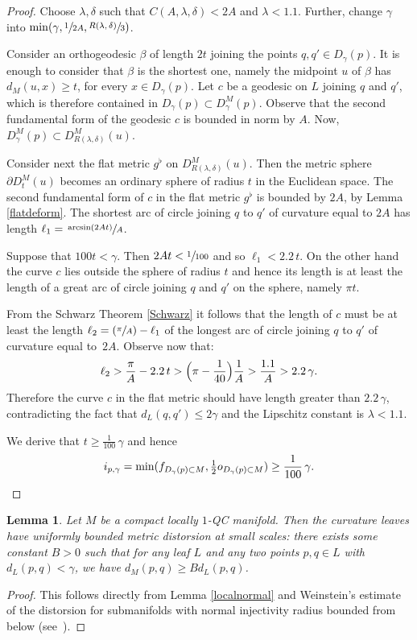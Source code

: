 \documentclass[10pt]{amsart}
\newcommand{\Psfrac}[2]{(\sfrac{#1}{#2})}
\newtheorem{lemma}[theorem]{Lemma}
\theoremstyle{definition}
\theoremstyle{remark}
\numberwithin{equation}{section}
\begin{document}
\begin{proof}
Choose $\lambda, \delta$ such that $C(A,\lambda,\delta) < 2A$ and
$\lambda <1.1$. Further, change $\gamma$ into $\min(\gamma, \sfrac{1}{2A}, \sfrac{R(\lambda, \delta)}{3})$.

Consider an orthogeodesic $\beta$ of length $2t$ joining the points $q,q'\in D_{\gamma}(p)$.
It is enough to consider that $\beta$ is the shortest one, namely the midpoint $u$ of $\beta$
has $d_M(u,x) \geq t$, for every $x\in D_{\gamma}(p)$.
Let $c$ be a geodesic on $L$ joining $q$ and $q'$, which is therefore contained in $D_{\gamma}(p)
\subset D^M_{\gamma}(p)$. Observe that the second fundamental form of the geodesic $c$ is bounded in norm by $A$.
Now, $D^M_{\gamma}(p)\subset D^M_{R(\lambda,\delta)}(u)$.

Consider next the flat metric $g^{\flat}$ on $D^M_{R(\lambda,\delta)}(u)$. Then the metric sphere
$\partial D^M_{t}(u)$ becomes an ordinary sphere of radius $t$ in the Euclidean space.
The second fundamental form of $c$ in the flat metric $g^{\flat}$ is bounded by $2A$, by Lemma \ref{flatdeform}.
The shortest arc of circle joining $q$ to $q'$ of curvature equal to $2A$ has length
$\ell_1=\sfrac{\arcsin(2At)}{A}$.

Suppose that $100t < \gamma$. Then $2At< \sfrac{1}{100}$ and so $\ell_1 < 2.2\, t$.
On the other hand the curve $c$ lies outside the sphere of radius $t$ and hence its length is
at least the length of a great arc of circle joining $q$ and $q'$ on the sphere, namely $\pi t$.

From the Schwarz Theorem \ref{Schwarz} it follows that the length of $c$ must be at least
the length $\ell_2=\Psfrac{\pi}{A}-\ell_1$ of the longest arc of circle joining $q$ to $q'$ of curvature equal to~$2A$.
Observe now that:
\[ \ell_2> \frac{\pi}{A}-2.2\, t > \Bigl(\pi -\frac{1}{40}\Bigr)\frac{1}{A} > \frac{1.1}{A} > 2.2\, \gamma.\]
Therefore the curve $c$ in the flat metric should have length greater than $2.2\, \gamma$, contradicting the fact that
$d_L(q,q') \leq 2\gamma$ and the Lipschitz constant is $\lambda < 1.1$.

We derive that $t \geq \frac{1}{100}\,\gamma$ and hence
\[ i_{p,\gamma}= \min(f_{D_{\gamma}(p)\subset M}, \tfrac12 o_{D_{\gamma}(p)\subset M}) \geq \frac{1}{100}\, \gamma.\qedhere\]
\end{proof}

\begin{lemma}\label{Weinstein}
Let $M$ be a compact locally $1$-QC manifold. Then the curvature leaves have uniformly bounded metric distorsion at small scales:
there exists some constant $B>0$ such that for any leaf $L$ and any two points $p,q\in L$ with
$d_L(p,q) < \gamma$, we have $d_M(p,q)\geq B d_L(p,q)$.
\end{lemma}
\begin{proof}
This follows directly from Lemma \ref{localnormal} and Weinstein's estimate of the distorsion for submanifolds
with normal injectivity radius bounded from below (see~\cite[Cor.\,3.5]{Wein}).
\end{proof}
\end{document}
